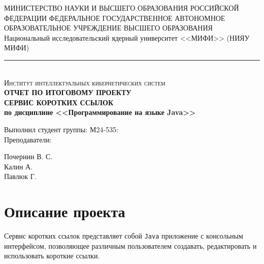 \documentclass[a4paper, 14pt]{article}
\def\Year{\expandafter\YEAR\the\year}
\def\YEAR#1#2#3#4{#1#2#3#4}
\begin{document}
\begin{titlepage}
	\center
	МИНИСТЕРСТВО НАУКИ И ВЫСШЕГО ОБРАЗОВАНИЯ РОССИЙСКОЙ ФЕДЕРАЦИИ\linebreak
	ФЕДЕРАЛЬНОЕ ГОСУДАРСТВЕННОЕ АВТОНОМНОЕ ОБРАЗОВАТЕЛЬНОЕ УЧРЕЖДЕНИЕ ВЫСШЕГО ОБРАЗОВАНИЯ\linebreak
	Национальный исследовательский ядерный университет <<МИФИ>> (НИЯУ МИФИ)
	\noindent\rule{500pt}{0.8pt} \\
	\textsc{\Large Институт интеллектуальных кибернетических систем}\\[8.5cm]

	{ \huge \bfseries ОТЧЕТ ПО ИТОГОВОМУ ПРОЕКТУ	\\
	\Large \mdseries СЕРВИС КОРОТКИХ ССЫЛОК \\
	\large по дисциплине <<Программирование на языке Java>>}\\[7.0cm]


	\begin{multicols}{2}
		\begin{flushright} \large

			{Выполнил студент группы: М24-535:}\\[0.5cm]

			{Преподаватели:\\}

		\end{flushright}
		\begin{flushright}

			{Почернин В. С.}\\[0.5cm]


			Калин А.\\
			Павлюк Г.

		\end{flushright}
	\end{multicols}

	\flushright{
		{\today}\\[0.5cm]
	}
	\centering{
		Санкт-Петербург\\
		\Year
	}

	\vfill
\end{titlepage}

\large
\tableofcontents

\newpage
\section{Описание проекта}

Сервис коротких ссылок представляет собой \texttt{Java} приложение с консольным интерфейсом, позволяющее различным пользователем создавать, редактировать и использовать короткие ссылки.
\end{document}
